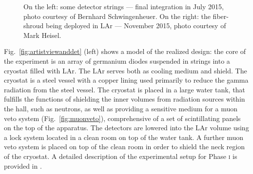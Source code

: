 \begin{figure}
	\centering
	\caption{On the left: some detector strings --- final integration in July 2015, photo courtesy of Bernhard Schwingenheuer. On the right: the fiber-shroud being deployed in LAr --- November 2015, photo courtesy of Mark Heisel.}\label{fig:stringsfibers}
\end{figure}

Fig.~\ref{fig:artistviewanddet} (left) shows a model of the realized design: the core of the experiment is an array of germanium diodes suspended in strings into a cryostat filled with LAr. The LAr serves both as cooling medium and shield. The cryostat is a steel vessel with a copper lining used primarily to reduce the gamma radiation from the steel vessel. The cryostat is placed in a large water tank, that fulfills the functions of shielding the inner volumes from radiation sources within the hall, such as neutrons, as well as providing a sensitive medium for a muon veto system (Fig.~\ref{fig:muonveto}), comprehensive of a set of scintillating panels on the top of the apparatus. The detectors are lowered into the LAr volume using a lock system located in a clean room on top of the water tank. A further muon veto system is placed on top of the clean room in order to shield the neck region of the cryostat. A detailed description of the experimental setup for Phase \textsc{i} is provided in \cite{gerdadescription}.

